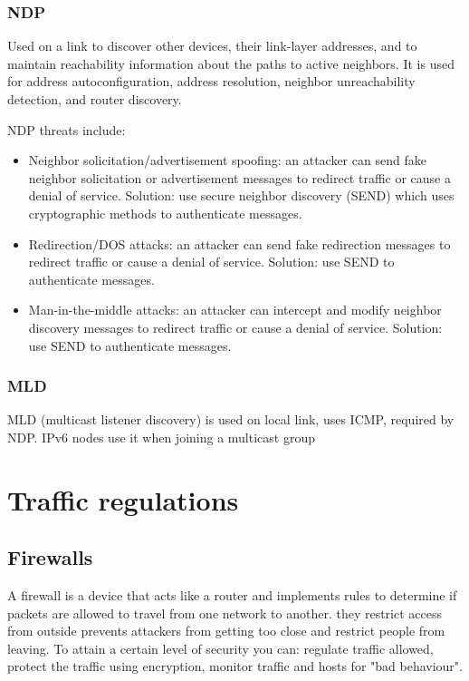 \subsection{NDP}
Used on a link to discover other devices, their link-layer addresses, and to maintain reachability information about the paths to active neighbors. It is used for address autoconfiguration, address resolution, neighbor unreachability detection, and router discovery.

NDP threats include:
\begin{itemize}
    \item Neighbor solicitation/advertisement spoofing: an attacker can send fake neighbor solicitation or advertisement messages to redirect traffic or cause a denial of service. Solution: use secure neighbor discovery (SEND) which uses cryptographic methods to authenticate messages.
    \item Redirection/DOS attacks: an attacker can send fake redirection messages to redirect traffic or cause a denial of service. Solution: use SEND to authenticate messages.
    \item Man-in-the-middle attacks: an attacker can intercept and modify neighbor discovery messages to redirect traffic or cause a denial of service. Solution: use SEND to authenticate messages.
\end{itemize}

\subsection{MLD}
MLD (multicast listener discovery) is used on local link, uses ICMP, required by NDP. IPv6 nodes use it when joining a multicast group

\chapter{Traffic regulations}
\section{Firewalls}
A firewall is a device that acts like a router and implements rules to determine if packets are allowed to travel from one network to another. they restrict access from outside
prevents attackers from getting too close and restrict people from leaving. To attain a certain level of security you can: regulate traffic allowed, protect
the traffic using encryption, monitor traffic and hosts for "bad behaviour".

